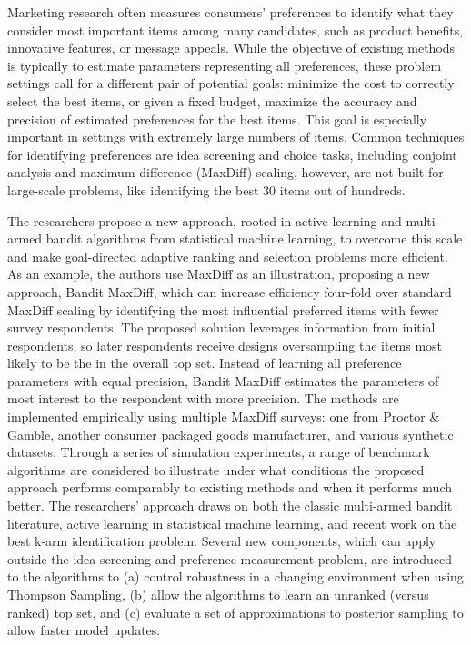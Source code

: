 \documentclass[nonblindrev]{informs3}
\begin{document}
\ABSTRACT
{%
Marketing research often measures consumers' preferences to identify what they consider most important items among many candidates, such as product benefits, innovative features, or message appeals. While the objective of existing methods is typically to estimate parameters representing all preferences, these problem settings call for a different pair of potential goals: minimize the cost to correctly select the best items, or given a fixed budget, maximize the accuracy and precision of estimated preferences for the best items. This goal is especially important in settings with extremely large numbers of items. Common techniques for identifying preferences are idea screening and choice tasks, including conjoint analysis and maximum-difference (MaxDiff) scaling, however, are not built for large-scale problems, like identifying the best 30 items out of hundreds. 

The researchers propose a new approach, rooted in active learning and multi-armed bandit algorithms from statistical machine learning, to overcome this scale and make goal-directed adaptive ranking and selection problems more efficient. As an example, the authors use MaxDiff as an illustration, proposing a new approach, Bandit MaxDiff, which can increase efficiency four-fold over standard MaxDiff scaling by identifying the most influential preferred items with fewer survey respondents. The proposed solution leverages information from initial respondents, so later respondents receive designs oversampling the items most likely to be the in the overall top set. Instead of learning all preference parameters with equal precision, Bandit MaxDiff estimates the parameters of most interest to the respondent with more precision. The methods are implemented empirically using multiple MaxDiff surveys: one from Proctor \& Gamble, another consumer packaged goods manufacturer, and various synthetic datasets. Through a series of simulation experiments, a range of benchmark algorithms are considered to illustrate under what conditions the proposed approach performs comparably to existing methods and when it performs much better. The researchers' approach draws on both the classic multi-armed bandit literature, active learning in statistical machine learning, and recent work on the best k-arm identification problem. Several new components, which can apply outside the idea screening and preference measurement problem, are introduced to the algorithms to (a) control robustness in a changing environment when using Thompson Sampling, (b) allow the algorithms to learn an unranked (versus ranked) top set, and (c) evaluate a set of approximations to posterior sampling to allow faster model updates.

} ~ \\
\end{document}
